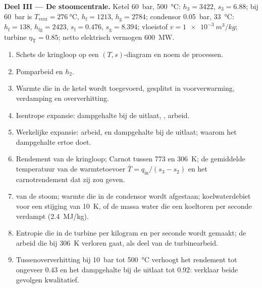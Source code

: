 \begin{problem}
\textbf{Deel III --- De stoomcentrale.}
Ketel \qty{60}{bar}, \qty{500}{\celsius}: $h_3 = 3422$, $s_3 = 6.88$; bij
\qty{60}{bar} is $T_{\text{verz}} = \qty{276}{\celsius}$, $h_{\text{f}} = 1213$,
$h_{\text{g}} = 2784$; condensor \qty{0.05}{bar}, \qty{33}{\celsius}:
$h_{\text{f}} = 138$, $h_{\text{fg}} = 2423$, $s_{\text{f}} = 0.476$,
$s_{\text{g}} =
8.394$; vloeistof $v = \qty{1e-3}{m^3/kg}$; turbine
$\eta_{\text{T}} = 0.85$;
netto elektrisch vermogen \qty{600}{MW}.
\begin{enumerate}[resume]
  \item Schets de kringloop op een $(T,s)$-diagram en noem de processen.
  \item Pomparbeid en $h_2$.
  \item Warmte die in de ketel wordt toegevoerd, gesplitst in
        voorverwarming, verdamping
        en oververhitting.
  \item Isentrope expansie: dampgehalte bij de uitlaat, , arbeid.
  \item Werkelijke expansie: arbeid,  en dampgehalte bij de
        uitlaat; waarom het
        dampgehalte ertoe doet.
  \item Rendement van de kringloop; Carnot tussen \qty{773}{} en \qty{306}{K};
        de gemiddelde temperatuur van de warmtetoevoer
        $\bar T = q_{\text{in}}/(s_3
        - s_2)$ en het carnotrendement
        dat zij zou geven.
  \item {} van de stoom; warmte die in de condensor wordt
        afgestaan; koelwaterdebiet
        voor een stijging van \qty{10}{K}, of de massa water die een koeltoren
        per seconde verdampt (\qty{2.4}{MJ/kg}).
  \item Entropie die in de turbine per kilogram en per seconde wordt gemaakt;
        de arbeid die bij \qty{306}{K} verloren gaat, als deel van de
        turbinearbeid.
  \item Tussenoververhitting bij \qty{10}{bar} tot \qty{500}{\celsius} verhoogt het
        rendement tot ongeveer $0.43$ en het dampgehalte bij de uitlaat tot $0.92$:
        verklaar beide gevolgen kwalitatief.
\end{enumerate}


\end{problem}
